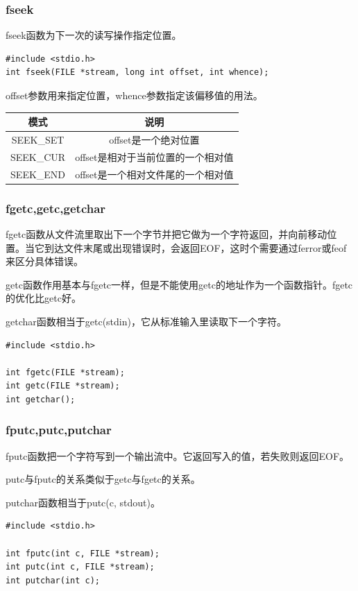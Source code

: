 \documentclass{beamer}
\begin{document}
\begin{frame}[fragile]
\frametitle{fseek}
fseek函数为下一次的读写操作指定位置。
\begin{example}[fseek函数原型]
\begin{verbatim}
#include <stdio.h>
int fseek(FILE *stream, long int offset, int whence);
\end{verbatim}
\end{example}
offset参数用来指定位置，whence参数指定该偏移值的用法。
\begin{table}
\begin{tabular}{cc}
\toprule
\textbf{模式} & \textbf{说明} \\
\midrule
SEEK\_SET & offset是一个绝对位置\\
SEEK\_CUR & offset是相对于当前位置的一个相对值\\
SEEK\_END & offset是一个相对文件尾的一个相对值\\
\bottomrule
\end{tabular}

\end{table}
\end{frame}
\begin{frame}[fragile]
\frametitle{fgetc,getc,getchar}
fgetc函数从文件流里取出下一个字节并把它做为一个字符返回，并向前移动位置。当它到达文件末尾或出现错误时，会返回EOF，这时个需要通过ferror或feof来区分具体错误。

getc函数作用基本与fgetc一样，但是不能使用getc的地址作为一个函数指针。fgetc的优化比getc好。

getchar函数相当于getc(stdin)，它从标准输入里读取下一个字符。
\begin{example}
\begin{verbatim}
#include <stdio.h>

int fgetc(FILE *stream);
int getc(FILE *stream);
int getchar();
\end{verbatim}
\end{example}

\end{frame}
\begin{frame}[fragile]
\frametitle{fputc,putc,putchar}
fputc函数把一个字符写到一个输出流中。它返回写入的值，若失败则返回EOF。

putc与fputc的关系类似于getc与fgetc的关系。

putchar函数相当于putc(c, stdout)。
\begin{example}
\begin{verbatim}
#include <stdio.h>

int fputc(int c, FILE *stream);
int putc(int c, FILE *stream);
int putchar(int c);
\end{verbatim}
\end{example}

\end{frame}
\end{document}
